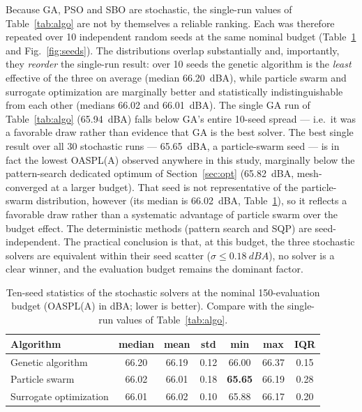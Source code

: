 \documentclass[preprint,3p,times]{elsarticle}
\begin{document}
Because GA, PSO and SBO are stochastic, the single-run values of
Table~\ref{tab:algo} are not by themselves a reliable ranking. Each was
therefore repeated over 10 independent random seeds at the same nominal
budget (Table~\ref{tab:seeds} and Fig.~\ref{fig:seeds}). The distributions
overlap substantially and, importantly, they \emph{reorder} the single-run
result: over 10 seeds the genetic algorithm is the \emph{least} effective of
the three on average (median \SI{66.20}{dBA}), while particle swarm and
surrogate optimization are marginally better and statistically
indistinguishable from each other (medians \SI{66.02}{} and
\SI{66.01}{dBA}). The single GA run of Table~\ref{tab:algo}
(\SI{65.94}{dBA}) falls below GA's entire 10-seed spread --- i.e.\ it was a
favorable draw rather than evidence that GA is the best solver. The
best single result over all 30 stochastic runs --- \SI{65.65}{dBA}, a
particle-swarm seed --- is in fact the lowest OASPL(A) observed anywhere in
this study, marginally below the pattern-search dedicated optimum of
Section~\ref{sec:opt} (\SI{65.82}{dBA}, mesh-converged at a larger budget).
That seed is not representative of the particle-swarm distribution, however
(its median is \SI{66.02}{dBA}, Table~\ref{tab:seeds}), so it reflects a
favorable draw rather than a systematic advantage of particle swarm over the
budget effect. The deterministic
methods (pattern search and SQP) are seed-independent. The practical
conclusion is that, at this budget, the three stochastic solvers are
equivalent within their seed scatter ($\sigma\le\SI{0.18}{dBA}$), no solver
is a clear winner, and the evaluation budget remains the dominant factor.

\begin{table}[!htbp]\centering
\caption{Ten-seed statistics of the stochastic solvers at the nominal
150-evaluation budget (OASPL(A) in dBA; lower is better). Compare with the
single-run values of Table~\ref{tab:algo}.}
\label{tab:seeds}
\begin{tabular}{@{}lcccccc@{}}
\toprule
Algorithm & median & mean & std & min & max & IQR \\
\midrule
Genetic algorithm      & 66.20 & 66.19 & 0.12 & 66.00 & 66.37 & 0.15 \\
Particle swarm         & 66.02 & 66.01 & 0.18 & \textbf{65.65} & 66.19 & 0.28 \\
Surrogate optimization & 66.01 & 66.02 & 0.10 & 65.88 & 66.17 & 0.20 \\
\bottomrule
\end{tabular}
\end{table}
\end{document}

